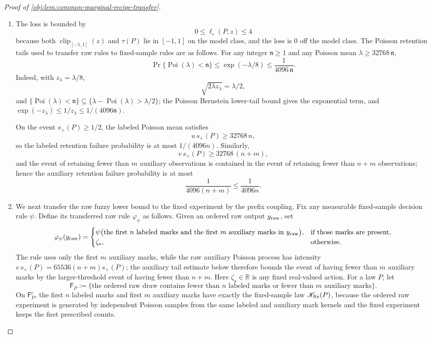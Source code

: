 \documentclass[11pt]{article}
\begin{document}
\begin{proof}[Proof of \cref{obj:lem:common-marginal-recipe-transfer}]
\begin{enumerate}
\item The loss is bounded by
\[
0\le \ell_\epsilon(P,z)\le 4
\]
because both \(\operatorname{clip}_{[-1,1]}(z)\) and \(\tau(P)\) lie in \([-1,1]\) on the model class, and the loss is \(0\) off the model class.  The Poisson retention tails used to transfer raw rules to fixed-sample rules are as follows.  For any integer \(\mathfrak n\ge1\) and any Poisson mean \(\lambda\ge32768\,\mathfrak n\),
\[
\Pr\{\operatorname{Poi}(\lambda)<\mathfrak n\}
\le
\exp(-\lambda/8)
\le
\frac1{4096\,\mathfrak n}.
\]
Indeed, with \(z_\lambda=\lambda/8\),
\[
\sqrt{2\lambda z_\lambda}=\lambda/2,
\]
and \(\{\operatorname{Poi}(\lambda)<\mathfrak n\}\subseteq
\{\lambda-\operatorname{Poi}(\lambda)>\lambda/2\}\); the Poisson Bernstein lower-tail bound gives the exponential term, and \(\exp(-z_\lambda)\le 1/z_\lambda\le1/(4096\mathfrak n)\).

On the event \(s_+(P)\ge1/2\), the labeled Poisson mean satisfies
\[
u\,s_+(P)\ge 32768\,n,
\]
so the labeled retention failure probability is at most \(1/(4096n)\).  Similarly,
\[
v\,s_+(P)\ge 32768\,(n+m),
\]
and the event of retaining fewer than \(m\) auxiliary observations is contained in the event of retaining fewer than \(n+m\) observations; hence the auxiliary retention failure probability is at most
\[
\frac1{4096(n+m)}\le \frac1{4096n}.
\] %

\item We next transfer the raw fuzzy lower bound to the fixed experiment by the prefix coupling.  Fix any measurable fixed-sample decision rule \(\psi\).  Define its transferred raw rule \(\varphi_\psi\) as follows.  Given an ordered raw output \(y_{\rm raw}\), set
\[
\varphi_\psi(y_{\rm raw})
=
\begin{cases}
\psi\bigl(\text{the first \(n\) labeled marks and the first \(m\) auxiliary marks in \(y_{\rm raw}\)}\bigr),
& \text{if those marks are present},\\
\zeta_\star,& \text{otherwise}.
\end{cases}
\]
The rule uses only the first \(m\) auxiliary marks, while the raw auxiliary Poisson process has intensity \(v\,s_+(P)=65536(n+m)s_+(P)\); the auxiliary tail estimate below therefore bounds the event of having fewer than \(m\) auxiliary marks by the larger-threshold event of having fewer than \(n+m\).  Here \(\zeta_\star\in\mathbb R\) is any fixed real-valued action.  For a law \(P\), let
\[
\mathsf F_P
:=
\bigl\{\text{the ordered raw draw contains fewer than \(n\) labeled marks or fewer than \(m\) auxiliary marks}\bigr\}.
\]
On \(\mathsf F_P^c\), the first \(n\) labeled marks and first \(m\) auxiliary marks have exactly the fixed-sample law \(\mathscr K_{\rm fix}(P)\), because the ordered raw experiment is generated by independent Poisson samples from the same labeled and auxiliary mark kernels and the fixed experiment keeps the first prescribed counts.


\end{enumerate}
\end{proof}
\end{document}
